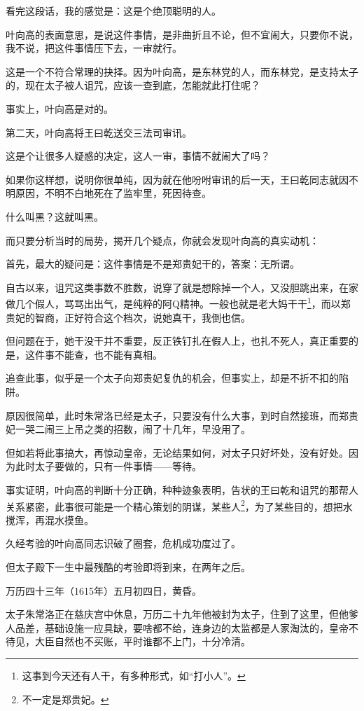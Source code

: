 \begin{multicols}{\theparacolNo}
看完这段话，我的感觉是：这是个绝顶聪明的人。

叶向高的表面意思，是说这件事情，是非曲折且不论，但不宜闹大，只要你不说，我不说，把这件事情压下去，一审就行。

这是一个不符合常理的抉择。因为叶向高，是东林党的人，而东林党，是支持太子的，现在太子被人诅咒，应该一查到底，怎能就此打住呢？

事实上，叶向高是对的。

第二天，叶向高将王曰乾送交三法司审讯。

这是个让很多人疑惑的决定，这人一审，事情不就闹大了吗？

如果你这样想，说明你很单纯，因为就在他吩咐审讯的后一天，王曰乾同志就因不明原因，不明不白地死在了监牢里，死因待查。

什么叫黑？这就叫黑。

而只要分析当时的局势，揭开几个疑点，你就会发现叶向高的真实动机：

首先，最大的疑问是：这件事情是不是郑贵妃干的，答案：无所谓。

自古以来，诅咒这类事数不胜数，说穿了就是想除掉一个人，又没胆跳出来，在家做几个假人，骂骂出出气，是纯粹的阿Q精神。一般也就是老大妈干干\footnote{这事到今天还有人干，有多种形式，如“打小人”。}，而以郑贵妃的智商，正好符合这个档次，说她真干，我倒也信。

但问题在于，她干没干并不重要，反正铁钉扎在假人上，也扎不死人，真正重要的是，这件事不能查，也不能有真相。

追查此事，似乎是一个太子向郑贵妃复仇的机会，但事实上，却是不折不扣的陷阱。

原因很简单，此时朱常洛已经是太子，只要没有什么大事，到时自然接班，而郑贵妃一哭二闹三上吊之类的招数，闹了十几年，早没用了。

但如若将此事搞大，再惊动皇帝，无论结果如何，对太子只好坏处，没有好处。因为此时太子要做的，只有一件事情——等待。

事实证明，叶向高的判断十分正确，种种迹象表明，告状的王曰乾和诅咒的那帮人关系紧密，此事很可能是一个精心策划的阴谋，某些人\footnote{不一定是郑贵妃。}，为了某些目的，想把水搅浑，再混水摸鱼。

久经考验的叶向高同志识破了圈套，危机成功度过了。

但太子殿下一生中最残酷的考验即将到来，在两年之后。

万历四十三年（1615年）五月初四日，黄昏。

太子朱常洛正在慈庆宫中休息，万历二十九年他被封为太子，住到了这里，但他爹人品差，基础设施一应具缺，要啥都不给，连身边的太监都是人家淘汰的，皇帝不待见，大臣自然也不买账，平时谁都不上门，十分冷清。


\end{multicols}
